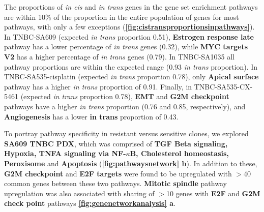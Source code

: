 
The proportions of \textit{in cis} and \textit{in trans} genes in the gene set enrichment pathways are within 10\% of the proportion in the entire population of genes for most pathways, with only a few exceptions (\textbf{\autoref{fig:cistransproportionsinpathways}}). In TNBC-SA609 (expected \textit{in trans} proportion 0.51), \textbf{Estrogen response late} pathway has a lower percentage of \textit{in trans} genes (0.32), while \textbf{MYC targets V2} has a higher percentage of \textit{in trans} genes (0.79). In TNBC-SA1035 all pathway proportions are within the expected range (0.93 \textit{in trans} proportion). In TNBC-SA535-cisplatin (expected \textit{in trans} proportion 0.78), only \textbf{Apical surface} pathway has a higher \textit{in trans} proportion of 0.91. Finally, in TNBC-SA535-CX-5461 (expected \textit{in trans} proportion 0.78), \textbf{EMT} and \textbf{G2M checkpoint} pathways have a higher \textit{in trans} proportion (0.76 and 0.85, respectively), and \textbf{Angiogenesis} has a lower \textbf{in trans} proportion of 0.43.

To portray pathway specificity in resistant versus sensitive clones, we explored \textbf{SA609 TNBC PDX}, which was  comprised of \textbf{TGF Beta signaling, Hypoxia, TNFA signaling via NF-$\kappa$B, Cholesterol homeostasis, Peroxisome} and \textbf{Apoptosis} (\textbf{\autoref{fig:pathwaysnetwork} b}). In addition to these, \textbf{G2M checkpoint} and \textbf{E2F targets} were found to be upregulated with $>$40 common genes between these two pathways. \textbf{Mitotic spindle} pathway upregulation was also associated with sharing of $>$10 genes with \textbf{E2F} and \textbf{G2M check point} pathways \textbf{\autoref{fig:genenetworkanalysis} a}.


